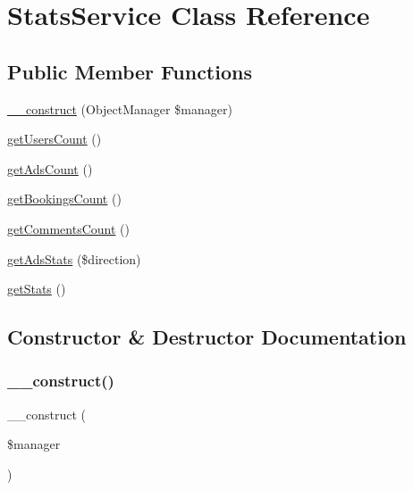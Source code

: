 \hypertarget{class_app_1_1_service_1_1_stats_service}{}\section{Stats\+Service Class Reference}
\label{class_app_1_1_service_1_1_stats_service}
\subsection*{Public Member Functions}
\begin{DoxyCompactItemize}
\item 
\mbox{\hyperlink{class_app_1_1_service_1_1_stats_service_a8863a08ad23f4c4652dba26523206ed2}{\+\_\+\+\_\+construct}} (Object\+Manager \$manager)
\item 
\mbox{\hyperlink{class_app_1_1_service_1_1_stats_service_a8a2c9fe04bd7747f2b15a671fc039320}{get\+Users\+Count}} ()
\item 
\mbox{\hyperlink{class_app_1_1_service_1_1_stats_service_acb765705560c805bf9d402a12c4cff96}{get\+Ads\+Count}} ()
\item 
\mbox{\hyperlink{class_app_1_1_service_1_1_stats_service_a6f61a8baac40c895291837999bba5a04}{get\+Bookings\+Count}} ()
\item 
\mbox{\hyperlink{class_app_1_1_service_1_1_stats_service_a0c77b1b623d1306b35b9dcbfbef72076}{get\+Comments\+Count}} ()
\item 
\mbox{\hyperlink{class_app_1_1_service_1_1_stats_service_a27fecb3713c54726ab5c57b86ea365a6}{get\+Ads\+Stats}} (\$direction)
\item 
\mbox{\hyperlink{class_app_1_1_service_1_1_stats_service_acf0272219b2977c1dc461ed86e995947}{get\+Stats}} ()
\end{DoxyCompactItemize}


\subsection{Constructor \& Destructor Documentation}
\mbox{\label{class_app_1_1_service_1_1_stats_service_a8863a08ad23f4c4652dba26523206ed2}} 
\subsubsection{\texorpdfstring{\_\_construct()}{\_\_construct()}}
{\footnotesize\ttfamily \+\_\+\+\_\+construct (\begin{DoxyParamCaption}\item[{Object\+Manager}]{\$manager }\end{DoxyParamCaption})}



